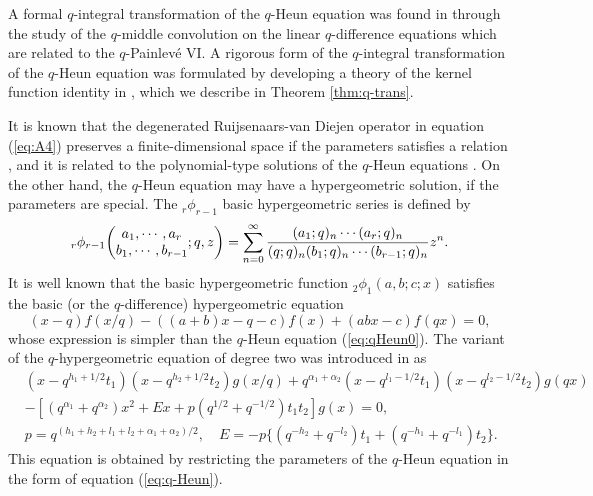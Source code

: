 \documentclass[12pt]{amsart}
\numberwithin{equation}{section}
\theoremstyle{definition}
\theoremstyle{remark}
\begin{document}
A formal $q$-integral transformation of the $q$-Heun equation was found in \cite{STT2} through the study of the $q$-middle convolution on the linear $q$-difference equations which are related to the $q$-Painlev\'e VI.
A rigorous form of the $q$-integral transformation of the $q$-Heun equation was formulated by developing a theory of the kernel function identity in \cite{TakK}, which we describe in Theorem \ref{thm:q-trans}.

It is known that the degenerated Ruijsenaars-van Diejen operator in equation (\ref{eq:A4}) preserves a finite-dimensional space if the parameters satisfies a relation \cite{TakqH}, and it is related to the polynomial-type solutions of the $q$-Heun equations \cite{KST}.
On the other hand, the $q$-Heun equation may have a hypergeometric solution, if the parameters are special.
The ${}_r\phi_{r-1}$ basic hypergeometric series is defined by
  \begin{align}
    {}_r\phi_{r-1} \biggl( \begin{array}{@{}c@{}} a_{1}, \cdots, a_{r} \\
b_{1}, \cdots, b_{r-1} \end{array} ;q,z \biggr) = \sum_{n = 0}^{\infty} \frac{(a_{1}; q)_{n} \cdots (a_{r}; q)_{n}}{(q; q)_{n}(b_{1}; q)_{n} \cdots (b_{r-1}; q)_{n}} z^{n}. \label{eq:bhs}
  \end{align}
It is well known that the basic hypergeometric function $_2 \phi _1 (a ,b ;c ;x) $ satisfies the basic (or the $q$-difference) hypergeometric equation 
\begin{equation*}
(x-q) f(x/q) - ((a+b)x -q-c)f(x)+ (abx-c)f(q x)=0, 
\end{equation*}
whose expression is simpler than the $q$-Heun equation (\ref{eq:qHeun0}).
The variant of the $q$-hypergeometric equation of degree two was introduced in \cite{HMST} as
\begin{align}
& (x-q^{h_1 +1/2} t_1) (x - q^{h_2 +1/2} t_2) g(x/q) + q^{\alpha _1 +\alpha _2} (x - q^{l_1-1/2}t_1 ) (x - q^{l_2 -1/2} t_2) g(q x) \label{eq:varqhgdeg2} \\
&  -[ (q^{\alpha _1} +q^{\alpha _2} ) x^2 +E x + p ( q^{1/2}+ q^{-1/2}) t_1 t_2 ] g(x) =0, \nonumber \\
& p= q^{(h_1 +h_2 + l_1 + l_2 +\alpha _1 +\alpha _2 )/2 } , \quad E= -p \{ (q^{- h_2 }+q^{-l_2 })t_1 + (q^{- h_1 }+ q^{- l_1 }) t_2 \} \nonumber .
\end{align}
This equation is obtained by restricting the parameters of the $q$-Heun equation in the form of equation (\ref{eq:q-Heun}). 
\end{document}
